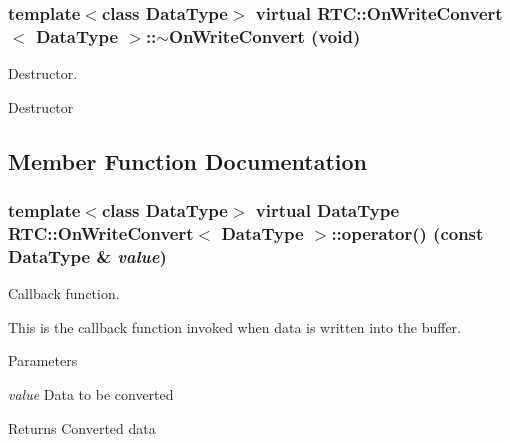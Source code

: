 \subsubsection[{$\sim$OnWriteConvert}]{\setlength{\rightskip}{0pt plus 5cm}template$<$class DataType$>$ virtual {\bf RTC::OnWriteConvert}$<$ DataType $>$::$\sim${\bf OnWriteConvert} (void)\hspace{0.3cm}{\ttfamily  [inline, virtual]}}\label{structRTC_1_1OnWriteConvert_a3ac98bc92ec58ac5c51a685958563829}


Destructor. 

Destructor 

\subsection{Member Function Documentation}
\subsubsection[{operator()}]{\setlength{\rightskip}{0pt plus 5cm}template$<$class DataType$>$ virtual DataType {\bf RTC::OnWriteConvert}$<$ DataType $>$::operator() (const DataType \& {\em value})\hspace{0.3cm}{\ttfamily  [pure virtual]}}\label{structRTC_1_1OnWriteConvert_a977a309e15012a5f7c30497b1c20341c}


Callback function. 

This is the callback function invoked when data is written into the buffer.


\begin{DoxyParams}{Parameters}
\item[{\em value}]Data to be converted \end{DoxyParams}
\begin{DoxyReturn}{Returns}
Converted data 
\end{DoxyReturn}
